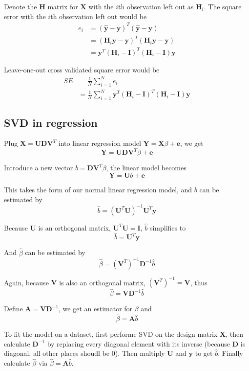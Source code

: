 \documentclass[12pt]{article}
\begin{document}
Denote the $\bm{H}$ matrix for $\bm{X}$ with the $i$th observation left out as $\bm{H}_i$.
The square error with the $i$th observation left out would be
\begin{align*}
	e_i & = (\hat{\bm{y}}-\bm{y})^T (\hat{\bm{y}}-\bm{y}) \\
	& = (\bm{H}_i \bm{y}-\bm{y})^T (\bm{H}_i \bm{y}-\bm{y}) \\
	& = \bm{y}^T (\bm{H}_i - \bm{I})^T (\bm{H}_i - \bm{I}) \bm{y}
\end{align*}

Leave-one-out cross validated square error would be
\begin{align*}
	SE & = \frac{1}{N} \sum_{i=1}^{N} e_i \\
	& = \frac{1}{N} \sum_{i=1}^{N}\bm{y}^T (\bm{H}_i - \bm{I})^T (\bm{H}_i - \bm{I}) \bm{y}
\end{align*}

\subsection{SVD in regression}
Plug $\bm{X} = \bm{U} \bm{D} \bm{V}^T$ into 
linear regression model $\bm{Y} = \bm{X}\beta + \bm{e} $,
we get \[ \bm{Y} = \bm{U} \bm{D} \bm{V}^T \beta + \bm{e} \]

Introduce a new vector $b = \bm{D} \bm{V}^T \beta$, 
the linear model becomes \[ \bm{Y} = \bm{U} b + \bm{e} \]

This takes the form of our normal linear regression model, 
and $b$ can be estimated by
\[ \hat{b} = (\bm{U}^T \bm{U})^{-1} \bm{U}^T  \bm{y} \]

Because $\bm{U}$ is an orthogonal matrix, $\bm{U}^T \bm{U} = \bm{I}$,
$\hat{b}$ simplifies to
\[ \hat{b} = \bm{U}^T  \bm{y} \]

And $\hat{\beta}$ can be estimated by
\[\hat{\beta} = (\bm{V}^T)^{-1} \bm{D}^{-1} \hat{b} \]

Again, because $\bm{V}$ is also an orthogonal matrix, $(\bm{V}^T)^{-1} = \bm{V}$, thus
\[\hat{\beta} = \bm{V} \bm{D}^{-1} \hat{b} \]

Define $\bm{A}=\bm{V} \bm{D}^{-1}$, we get an estimator for $\beta$ and
\[ \hat{\beta} = \bm{A} \hat{b} \]

To fit the model on a dataset, first performe SVD on the design matrix $\bm{X}$,
then calculate $\bm{D}^{-1}$ by replacing every diagonal element with its inverse (because $\bm{D}$ is diagonal, all other places shoudl be 0). Then multiply $\bm{U}$ and $\bm{y}$ to get $\hat{b}$. Finally calculate $\hat{\beta}$ via $\hat{\beta} = \bm{A} \hat{b}$.
\end{document}
